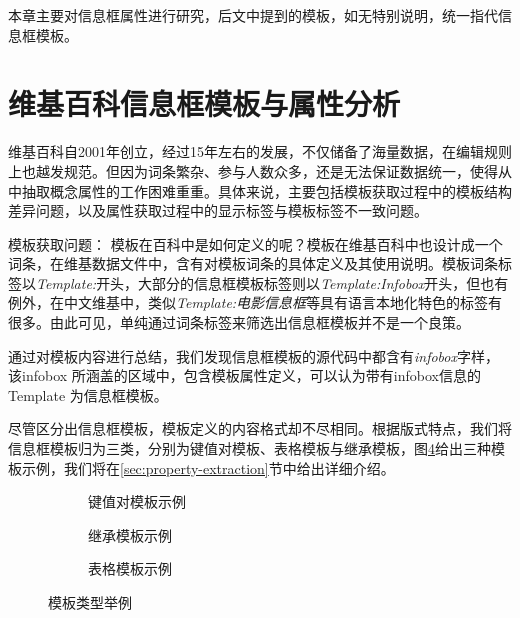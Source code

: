 本章主要对信息框属性进行研究，后文中提到的{\heiti 模板}，如无特别说明，统一指代{\heiti 信息框模板}。

\section{维基百科信息框模板与属性分析}
\label{sec:template-analysis}

维基百科自2001年创立，经过15年左右的发展，不仅储备了海量数据，在编辑规则上也越发规范。但因为词条繁杂、参与人数众多，还是无法保证数据统一，使得从中抽取概念属性的工作困难重重。具体来说，主要包括模板获取过程中的模板结构差异问题，以及属性获取过程中的显示标签与模板标签不一致问题。

{\heiti 模板获取问题：}
模板在百科中是如何定义的呢？模板在维基百科中也设计成一个词条，在维基数据文件中，含有对模板词条的具体定义及其使用说明。模板词条标签以\textit{Template:}开头，大部分的信息框模板标签则以\textit{Template:Infobox}开头，但也有例外，在中文维基中，类似\textit{Template:电影信息框}等具有语言本地化特色的标签有很多。由此可见，单纯通过词条标签来筛选出信息框模板并不是一个良策。

通过对模板内容进行总结，我们发现信息框模板的源代码中都含有\textit{infobox}字样，该infobox 所涵盖的区域中，包含模板属性定义，可以认为带有infobox信息的Template 为信息框模板。

尽管区分出信息框模板，模板定义的内容格式却不尽相同。根据版式特点，我们将信息框模板归为三类，分别为键值对模板、表格模板与继承模板，图\ref{fig:template-examples}给出三种模板示例，我们将在\ref{sec:property-extraction}节中给出详细介绍。

\begin{figure}[ht]
\centering
    \begin{subfigure}{7.2cm}
        \centering
        \caption{键值对模板示例}
        \label{fig:template-keyvalue}
    \end{subfigure}
    \hspace{0.01cm}
    \begin{subfigure}{7.2cm}
        \centering
        \caption{继承模板示例}
        \label{fig:template-inherit}
    \end{subfigure}
    \vspace{0.01cm}
    \begin{subfigure}{9.6cm}
        \centering
        \caption{表格模板示例}
        \label{fig:template-table}
    \end{subfigure}
\caption{模板类型举例}
\label{fig:template-examples}
\end{figure}

